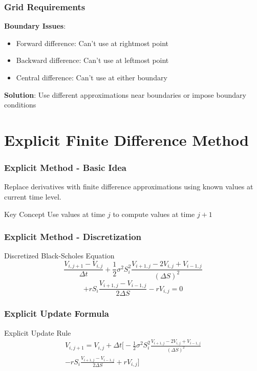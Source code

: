 \documentclass[aspectratio=169]{beamer}
\begin{document}
\begin{frame}
\frametitle{Grid Requirements}
\textbf{Boundary Issues}:
\begin{itemize}
\item Forward difference: Can't use at rightmost point
\item Backward difference: Can't use at leftmost point  
\item Central difference: Can't use at either boundary
\end{itemize}

\textbf{Solution}: Use different approximations near boundaries or impose boundary conditions
\end{frame}

\section{Explicit Finite Difference Method}

\begin{frame}
\frametitle{Explicit Method - Basic Idea}
Replace derivatives with finite difference approximations using known values at current time level.

\begin{block}{Key Concept}
Use values at time \(j\) to compute values at time \(j+1\)
\end{block}
\end{frame}

\begin{frame}
\frametitle{Explicit Method - Discretization}
\begin{block}{Discretized Black-Scholes Equation}
\[\frac{V_{i,j+1} - V_{i,j}}{\Delta t} + \frac{1}{2}\sigma^2 S_i^2 \frac{V_{i+1,j} - 2V_{i,j} + V_{i-1,j}}{(\Delta S)^2}\]
\[+ rS_i \frac{V_{i+1,j} - V_{i-1,j}}{2\Delta S} - rV_{i,j} = 0\]
\end{block}
\end{frame}

\begin{frame}
\frametitle{Explicit Update Formula}
\begin{block}{Explicit Update Rule}
\begin{multline}
V_{i,j+1} = V_{i,j} + \Delta t \bigg[ -\frac{1}{2}\sigma^2 S_i^2 \frac{V_{i+1,j} - 2V_{i,j} + V_{i-1,j}}{(\Delta S)^2} \\
- rS_i \frac{V_{i+1,j} - V_{i-1,j}}{2\Delta S} + rV_{i,j} \bigg]
\end{multline}
\end{block}
\end{frame}
\end{document}
